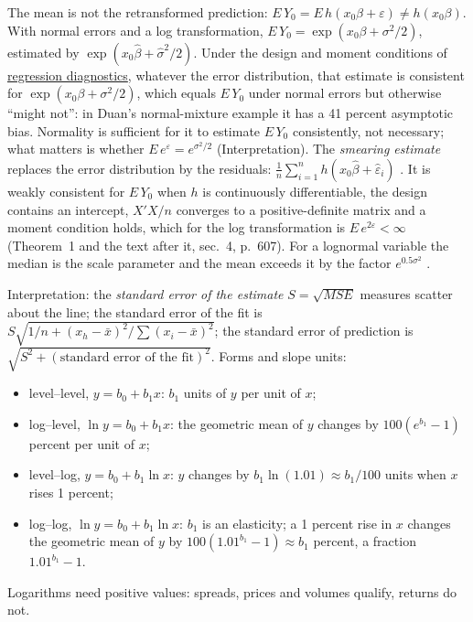 \begin{qfmethod}
The mean is not the retransformed prediction: $E\,Y_0=E\,h(x_0\beta+\varepsilon)\ne h(x_0\beta)$. With normal errors and a log transformation, $E\,Y_0=\exp(x_0\beta+\sigma^2/2)$, estimated by $\exp(x_0\hat\beta+\hat\sigma^2/2)$. Under the design and moment conditions of \hyperref[meth:regression-diagnostics-anova]{regression diagnostics}, whatever the error distribution, that estimate is consistent for $\exp(x_0\beta+\sigma^2/2)$, which equals $E\,Y_0$ under normal errors but otherwise ``might not'': in Duan's normal-mixture example it has a 41 percent asymptotic bias. Normality is sufficient for it to estimate $E\,Y_0$ consistently, not necessary; what matters is whether $E\,e^{\varepsilon}=e^{\sigma^2/2}$ (Interpretation). The \emph{smearing estimate} replaces the error distribution by the residuals: $\frac1n\sum_{i=1}^nh(x_0\hat\beta+\hat\varepsilon_i)$ \citep[secs.~2--3, eq.~(3.1), pp.~605--606]{smearing-retransformation-1983}. It is weakly consistent for $E\,Y_0$ when $h$ is continuously differentiable, the design contains an intercept, $X'X/n$ converges to a positive-definite matrix and a moment condition holds, which for the log transformation is $E\,e^{2\varepsilon}<\infty$ (Theorem~1 and the text after it, sec.~4, p.~607). For a lognormal variable the median is the scale parameter and the mean exceeds it by the factor $e^{0.5\sigma^2}$ \citep[sec.~1.3.6.6.9]{statistical-methods-handbook}.

 Interpretation: the \emph{standard error of the estimate} $S=\sqrt{MSE}$ measures scatter about the line; the standard error of the fit is $S\sqrt{1/n+(x_h-\bar x)^2/\sum(x_i-\bar x)^2}$; the standard error of prediction is $\sqrt{S^2+(\text{standard error of the fit})^2}$. Forms and slope units:
\begin{itemize}
\item level--level, $y=b_0+b_1x$: $b_1$ units of $y$ per unit of $x$;
\item log--level, $\ln y=b_0+b_1x$: the geometric mean of $y$ changes by $100(e^{b_1}-1)$ percent per unit of $x$;
\item level--log, $y=b_0+b_1\ln x$: $y$ changes by $b_1\ln(1.01)\approx b_1/100$ units when $x$ rises 1 percent;
\item log--log, $\ln y=b_0+b_1\ln x$: $b_1$ is an elasticity; a 1 percent rise in $x$ changes the geometric mean of $y$ by $100(1.01^{b_1}-1)\approx b_1$ percent, a fraction $1.01^{b_1}-1$.
\end{itemize}
Logarithms need positive values: spreads, prices and volumes qualify, returns do not.


\end{qfmethod}
